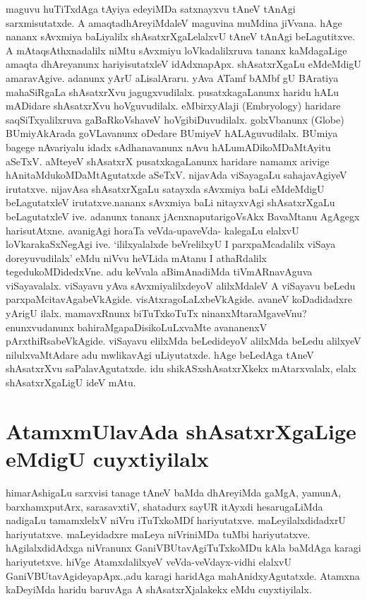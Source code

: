 maguvu huTiTxdAga tAyiya edeyiMDa satxnayxvu tAneV tAnAgi sarxmisutatxde. A amaqtadhAreyiMdaleV maguvina muMdina jiVvana. hAge nananx sAvxmiya baLiyalilx shAsatxrXgaLelalxvU tAneV tAnAgi beLagutitxve. A mAtaqsAthxnadalilx niMtu sAvxmiyu loVkadalilxruva tananx kaMdagaLige amaqta dhAreyanunx hariyisutatxleV idAdxnapApx. shAsatxrXgaLu eMdeMdigU amaravAgive. adanunx  yArU aLisalAraru. yAva ATamf bAMbf gU BAratiya mahaSiRgaLa shAsatxrXvu jagugxvudilalx. pusatxkagaLanunx haridu hALu mADidare shAsatxrXvu hoVguvudilalx.  eMbirxyAlaji {(\eng Embryology)} haridare saqSiTxyalilxruva gaBaRkoVshaveV hoVgibiDuvudilalx. golxVbanunx {(\eng Globe)} BUmiyAkArada goVLavanunx oDedare BUmiyeV hALAguvudilalx. BUmiya bagege nAvariyalu idadx sAdhanavanunx nAvu hALumADikoMDaMtAyitu aSeTxV. aMteyeV shAsatxrX pusatxkagaLanunx  haridare namamx arivige hAnitaMdukoMDaMtAgutatxde aSeTxV. nijavAda viSayagaLu sahajavAgiyeV irutatxve.  nijavAsa shAsatxrXgaLu satayxda sAvxmiya baLi eMdeMdigU beLagutatxleV irutatxve.nananx sAvxmiya baLi nitayxvAgi shAsatxrXgaLu beLagutatxleV ive. adanunx tananx jAcnxnaputarigoVsAkx BavaMtanu AgAgegx harisutAtxne. avanigAgi horaTa veVda-upaveVda- kalegaLu elalxvU loVkarakaSxNegAgi ive. `ililxyalalxde beVrelilxyU I parxpaMcadalilx viSaya doreyuvudilalx' eMdu niVvu heVLida mAtanu I athaRdalilx tegedukoMDidedxVne. adu keVvala aBimAnadiMda tiVmARnavAguva viSayavalalx. viSayavu yAva sAvxmiyalilxdeyoV alilxMdaleV A viSayavu beLedu parxpaMcitavAgabeVkAgide. visAtxragoLaLxbeVkAgide. avaneV koDadidadxre yArigU ilalx. mamavxRnunx biTuTxkoTuTx ninanxMtaraMgaveVnu? enunxvudanunx bahiraMgapaDisikoLuLxvaMte avananenxV pArxthiRsabeVkAgide. viSayavu elilxMda beLedideyoV alilxMda beLedu alilxyeV nilulxvaMtAdare adu mwlikavAgi uLiyutatxde. hAge beLedAga tAneV shAsatxrXvu saPalavAgutatxde. idu shikASxshAsatxrXkekx mAtarxvalalx, elalx shAsatxrXgaLigU ideV mAtu. 

\section*{AtamxmUlavAda shAsatxrXgaLige eMdigU cuyxtiyilalx}

himarAshigaLu sarxvisi tanage tAneV baMda dhAreyiMda gaMgA, yamunA, barxhamxputArx, sarasavxtiV, shatadurx sayUR itAyxdi hesarugaLiMda nadigaLu tamamxlelxV niVru iTuTxkoMDf hariyutatxve. maLeyilalxdidadxrU hariyutatxve. maLeyidadxre maLeya niVriniMDa tuMbi hariyutatxve. hAgilalxdidAdxga niVranunx GaniVBUtavAgiTuTxkoMDu kAla baMdAga karagi hariyutetxve. hiVge AtamxdalilxyeV veVda-veVdayx-vidhi elalxvU GaniVBUtavAgideyapApx.,adu karagi haridAga mahAnidxyAgutatxde. Atamxna kaDeyiMda haridu baruvAga A shAsatxrXjalakekx eMdu cuyxtiyilalx.

